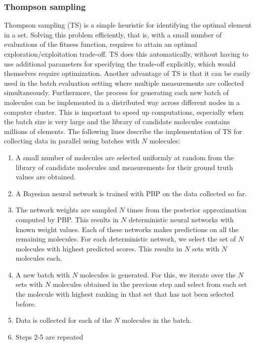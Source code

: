 \subsubsection{Thompson sampling}

Thompson sampling (TS) \cite{Thompson_1933} is a simple heuristic for identifying the optimal element in a set. Solving this problem efficiently, that is, with a small number of evaluations of the fitness function, requires to attain an optimal exploration/exploitation trade-off. TS does this automatically, without having to use additional parameters for specifying the trade-off explicitly, which would themselves require optimization. 
Another advantage of TS is that it can be easily used
in the batch evaluation setting where multiple measurements are collected simultaneously. Furthermore, the process for generating each new batch of molecules can be implemented in a distributed way across different nodes in a computer cluster. This is important to speed up computations, especially when the batch size is very large and the library of candidate molecules contains millions of elements. The following lines describe the implementation of TS for collecting data in parallel using batches with $N$ molecules:
\begin{enumerate}
\item A small number of molecules are selected uniformly at random from the library of candidate molecules and measurements for their ground truth values are obtained.
\item A Bayesian neural network is trained with PBP on the data collected so far.
\item The network weights are sampled $N$ times from the posterior approximation computed by PBP. This results in $N$ deterministic neural networks with known weight values. Each of these networks makes predictions on all the remaining molecules. For each deterministic network, we select the set of $N$ molecules with highest predicted scores. This results in $N$ sets with $N$ molecules each.
\item A new batch with $N$ molecules is generated. For this, we iterate over the $N$ sets with $N$ molecules obtained in the previous step and select from each set the molecule with highest ranking in that set that has not been selected before.
\item Data is collected for each of the $N$ molecules in the batch.
\item Steps 2-5 are repeated
\end{enumerate}

